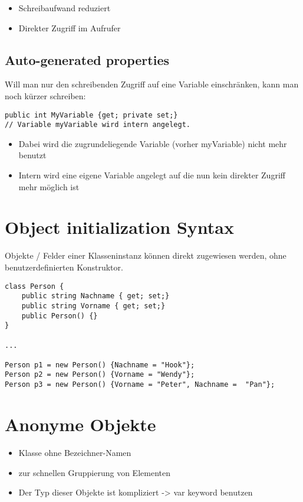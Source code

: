\begin{itemize}
\item Schreibaufwand reduziert
\item Direkter Zugriff im Aufrufer
\end{itemize}

\subsection{Auto-generated properties}
Will man nur den schreibenden Zugriff auf eine Variable einschränken, kann man noch kürzer schreiben:
\begin{lstlisting}[language={[Sharp]C}]
public int MyVariable {get; private set;}
// Variable myVariable wird intern angelegt.
\end{lstlisting}
\begin{itemize}
\item Dabei wird die zugrundeliegende Variable (vorher myVariable) nicht mehr benutzt
\item Intern wird eine eigene Variable angelegt auf die nun kein direkter Zugriff mehr möglich ist
\end{itemize}

\section{Object initialization Syntax}

Objekte / Felder einer Klasseninstanz können direkt zugewiesen werden, ohne benutzerdefinierten Konstruktor.
\begin{lstlisting}[language={[Sharp]C}]
class Person { 
	public string Nachname { get; set;} 
	public string Vorname { get; set;} 
	public Person() {} 
}

...

Person p1 = new Person() {Nachname = "Hook"}; 
Person p2 = new Person() {Vorname = "Wendy"}; 
Person p3 = new Person() {Vorname = "Peter", Nachname =  "Pan"};
\end{lstlisting}

\section{Anonyme Objekte}

\begin{itemize}
\item Klasse ohne Bezeichner-Namen
\item zur schnellen Gruppierung von Elementen 
\item Der Typ dieser Objekte ist kompliziert -{\textgreater} var keyword benutzen
\end{itemize}